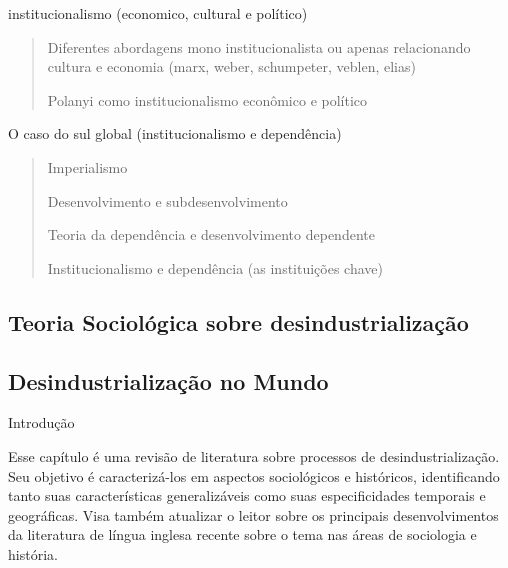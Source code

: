 institucionalismo (economico, cultural e político)

\begin{quote}
Diferentes abordagens mono institucionalista ou apenas relacionando
cultura e economia (marx, weber, schumpeter, veblen, elias)

Polanyi como institucionalismo econômico e político
\end{quote}

O caso do sul global (institucionalismo e dependência)

\begin{quote}
Imperialismo

Desenvolvimento e subdesenvolvimento

Teoria da dependência e desenvolvimento dependente

Institucionalismo e dependência (as instituições chave)
\end{quote}

\subsection{Teoria Sociológica sobre
desindustrialização}\label{teoria-socioluxf3gica-sobre-desindustrializauxe7uxe3o}

\subsection{Desindustrialização no
Mundo}\label{desindustrializauxe7uxe3o-no-mundo}

Introdução

Esse capítulo é uma revisão de literatura sobre processos de
desindustrialização. Seu objetivo é caracterizá-los em aspectos
sociológicos e históricos, identificando tanto suas características
generalizáveis como suas especificidades temporais e geográficas. Visa
também atualizar o leitor sobre os principais desenvolvimentos da
literatura de língua inglesa recente sobre o tema nas áreas de
sociologia e história.

